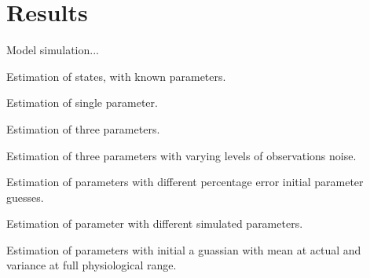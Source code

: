 \section{Results}

Model simulation...

Estimation of states, with known parameters.

Estimation of single parameter.

Estimation of three parameters.

Estimation of three parameters with varying levels of observations noise.

Estimation of parameters with different percentage error initial parameter guesses.

Estimation of parameter with different simulated parameters.

Estimation of parameters with initial a guassian with mean at actual and variance at full physiological range.

